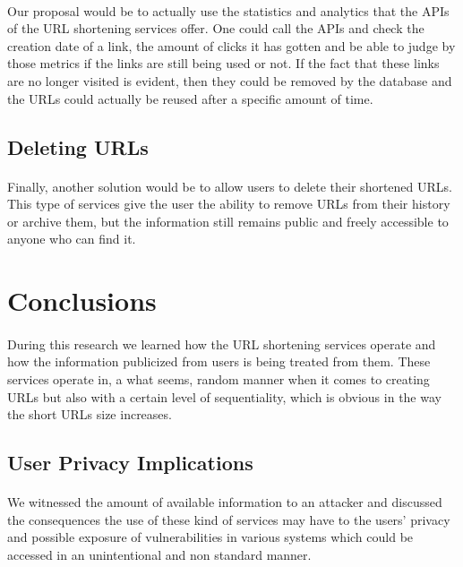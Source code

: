 \documentclass[12pt]{article}
\begin{document}
\paragraph{}
Our proposal would be to actually use the statistics and analytics that the APIs of the URL shortening services offer. One could call the APIs and check the creation date of a link, the amount of clicks it has gotten and be able to judge by those metrics if the links are still being used or not. If the fact that these links are no longer visited is evident, then they could be removed by the database and the URLs could actually be reused after a specific amount of time.

\subsection{Deleting URLs}

\paragraph{}
Finally, another solution would be to allow users to delete their shortened URLs. This type of services give the user the ability to remove URLs from their history or archive them, but the information still remains public and freely accessible to anyone who can find it.

\section{Conclusions}

\paragraph{}
During this research we learned how the URL shortening services operate and how the information publicized from users is being treated from them. These services operate in, a what seems, random manner when it comes to creating URLs but also with a certain level of sequentiality, which is obvious in the way the short URLs size increases.

\subsection{User Privacy Implications}

\paragraph{}
We witnessed the amount of available information to an attacker and discussed the consequences the use of these kind of services may have to the users' privacy and possible exposure of vulnerabilities in various systems which could be accessed in an unintentional and non standard manner.
\end{document}
